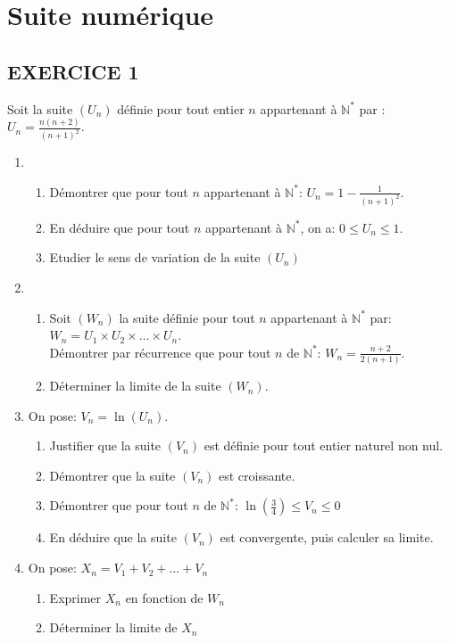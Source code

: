\documentclass[13pts]{report}
\begin{document}
\chapter{Suite numérique}
\section*{EXERCICE 1}
Soit la suite $(U_n)$ définie pour tout entier $n$ appartenant à $\mathbb{N}^*$ par : $U_n=\frac{n(n+2)}{(n+1)^2}$.
	\begin{enumerate}
		\item \begin{enumerate}
					\item Démontrer que pour tout $n$ appartenant à $\mathbb{N}^*$: $U_n=1-\frac{1}{(n+1)^2}$.
					\item En déduire que pour tout $n$ appartenant à $\mathbb{N}^*$, on a: $0 \leq U_n \leq 1$.
					\item Etudier le sens de variation de la suite $(U_n)$
			  \end{enumerate}
		  \item \begin{enumerate}
		  			\item Soit $(W_n)$ la suite définie pour tout $n$ appartenant à $\mathbb{N}^*$ par: $W_n=U_1 \times U_2 \times \dots \times U_n$.\\
		  			Démontrer  par récurrence que pour tout $n$ de $\mathbb{N}^*$: $W_n=\frac{n+2}{2(n+1)}$.
		  			\item Déterminer la limite de la suite $(W_n)$.
		  		\end{enumerate}
	  		\item On pose: $V_n=\ln(U_n)$.
	  			\begin{enumerate}
	  				\item Justifier que la suite $(V_n)$ est définie pour tout entier naturel non nul.
	  				\item Démontrer que la suite $(V_n)$ est croissante.
	  				\item Démontrer que pour tout $n$ de $\mathbb{N}^*$: $\ln(\frac{3}{4})\leq V_n \leq 0$
	  				\item En déduire que la suite $(V_n)$ est convergente, puis calculer sa limite.
	  			\end{enumerate}
	  		\item On pose: $X_n=V_1+V_2+\dots+V_n$
	  			\begin{enumerate}
	  				\item Exprimer $X_n$ en fonction de $W_n$
	  				\item Déterminer la limite de $X_n$
	  			\end{enumerate}
	\end{enumerate}
\end{document}
